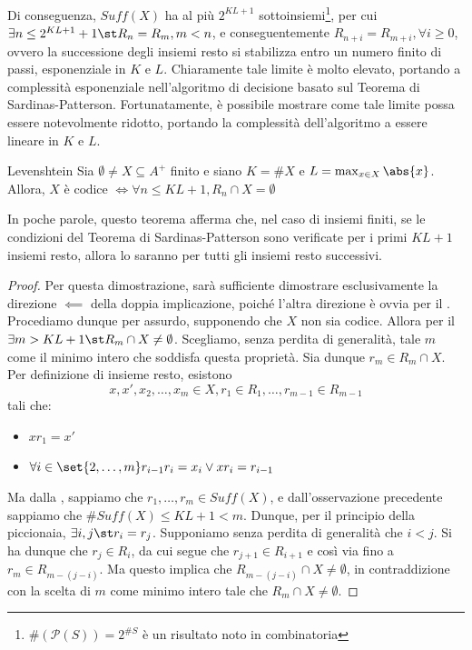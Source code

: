 Di conseguenza, \(Suff(X)\) ha al più \(2^{KL+1}\) sottoinsiemi\footnote{\(\#(\mathcal{P}(S)) = 2^{\#S}\) è un risultato noto in combinatoria}, per cui \(\exists n \leq 2^{KL+1} +1 \st R_n = R_m, m < n\), e conseguentemente \(R_{n+i} = R_{m+i}, \forall i \geq 0\), ovvero la successione degli insiemi resto si stabilizza entro un numero finito di passi, esponenziale in \(K\) e \(L\).
Chiaramente tale limite è molto elevato, portando a complessità esponenziale nell'algoritmo di decisione basato sul Teorema di Sardinas-Patterson.
Fortunatamente, è possibile mostrare come tale limite possa essere notevolmente ridotto, portando la complessità dell'algoritmo a essere lineare in \(K\) e \(L\).

\begin{theorem}{Levenshtein}
  Sia \(\emptyset \neq X \subseteq A^+\) finito e siano \(K = \# X\) e \(L = \max_{x \in X} \abs{x}\).
  Allora, \(X \text{ è codice } \iff \forall n \leq KL +1, R_n \cap X = \emptyset\)
\end{theorem}

In poche parole, questo teorema afferma che, nel caso di insiemi finiti, se le condizioni del Teorema di Sardinas-Patterson sono verificate per i primi \(KL+1\) insiemi resto, allora lo saranno per tutti gli insiemi resto successivi.

\begin{proof}
  Per questa dimostrazione, sarà sufficiente dimostrare esclusivamente la direzione \(\impliedby\) della doppia implicazione, poiché l'altra direzione è ovvia per il .
  Procediamo dunque per assurdo, supponendo che \(X\) non sia codice. Allora per il  \(\exists m > KL + 1 \st R_m \cap X \neq \emptyset\).
  Scegliamo, senza perdita di generalità, tale \(m\) come il minimo intero che soddisfa questa proprietà.
  Sia dunque \(r_m \in R_m \cap X\). Per definizione di insieme resto, esistono 
  \[x,x',x_2,\ldots,x_m \in X, r_1\in R_1,\ldots,r_{m-1} \in R_{m-1}\]
  tali che:
  \begin{itemize}
    \item \(xr_1=x'\) 
    \item \(\forall i \in \set{2,\ldots,m} r_{i-1}r_i=x_i \lor xr_i = r_{i-1}\)
  \end{itemize}
  Ma dalla , sappiamo che \(r_1,\ldots,r_m \in Suff(X)\), e dall'osservazione precedente sappiamo che \(\# Suff(X) \leq KL + 1 < m\).
  Dunque, per il principio della piccionaia, \(\exists i,j \st r_i=r_j\). Supponiamo senza perdita di generalità che \(i<j\).
  Si ha dunque che \(r_j \in R_i\), da cui segue che \(r_{j+1} \in R_{i+1}\) e così via fino a \(r_m \in R_{m-(j-i)}\).
  Ma questo implica che \(R_{m-(j-i)} \cap X \neq \emptyset\), in contraddizione con la scelta di \(m\) come minimo intero tale che \(R_m \cap X \neq \emptyset\).
\end{proof}

